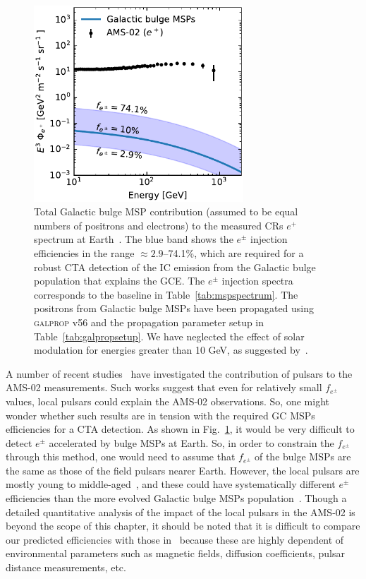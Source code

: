 \documentclass[doublespace,nopageskip]{VTthesis} %
\begin{document}
\begin{figure}[htb]
    \begin{center}
    \includegraphics[width=0.7\textwidth]{Figures/CTA/positrons_at_Earth.pdf}
    \caption{Total Galactic bulge MSP contribution (assumed to be equal numbers of positrons and electrons) to the measured CRs $e^+$ spectrum at Earth~\citep{2021PhR...894....1A}. The blue band shows the $e^\pm$ injection efficiencies in the range $\approx 2.9$--74.1\%, which are required for a robust CTA detection of the IC emission from the Galactic bulge population that explains the GCE. The $e^\pm$ injection spectra corresponds to the baseline in Table~\ref{tab:mspspectrum}.  The positrons from Galactic bulge MSPs have been propagated using \textsc{galprop} v56 and the propagation parameter setup in Table~\ref{tab:galpropsetup}. We have neglected the effect of solar modulation for energies greater than 10 GeV, as suggested by~\citet{2014AdSpR..53.1015S}.}\label{fig:MSPpositronsatEarth}
    \end{center}
 \end{figure}

A number of recent studies~\citep[e.g.,][]{2018PhRvD..98f3008C, 2020PhRvD.102b3015M} have investigated the contribution of pulsars to the AMS-02 measurements. Such works suggest that even for relatively small $f_{e^\pm}$ values, local pulsars could explain the AMS-02 observations. So, one might wonder whether such results are in tension with the required GC MSPs efficiencies for a CTA detection. As shown in Fig.~\ref{fig:MSPpositronsatEarth}, it would be very difficult to detect $e^\pm$ accelerated by bulge MSPs at Earth. So, in order to constrain the $f_{e^\pm}$ through this method, one would need to assume that $f_{e^\pm}$ of the bulge MSPs are the same as those of the field pulsars nearer Earth. However, the local pulsars are mostly young to middle-aged~\citep{2010A&A...524A..51D}, and these could have systematically different $e^\pm$ efficiencies than the more evolved Galactic bulge MSPs population~\citep{2021MNRAS.507.5161S}. Though a detailed quantitative analysis of the impact of the local pulsars in the AMS-02 is beyond the scope of this chapter, it should be noted that it is difficult to compare our predicted efficiencies with those in~\citep[e.g.,][]{2018PhRvD..98f3008C, 2020PhRvD.102b3015M} because these are highly dependent of environmental parameters such as magnetic fields, diffusion coefficients, pulsar distance measurements, etc.
\end{document}

